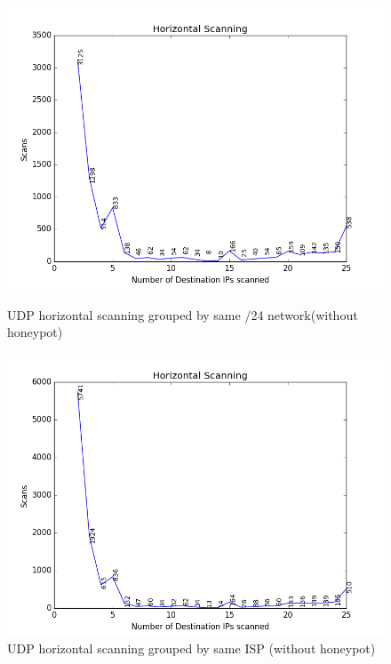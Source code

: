 \begin{figure}
\captionsetup{justification   = raggedright,
              singlelinecheck = false}
\centering
\begin{minipage}{.535\textwidth}
  \centering
  \includegraphics[width=1\linewidth]{images/horizontalscan_udp_classc}
  \caption{UDP horizontal scanning grouped by same /24 network(without honeypot)}
  \label{fig:horizontalscanningudpsameclassc}
\end{minipage}%
\begin{minipage}{.535\textwidth}
  \centering
  \includegraphics[width=1\linewidth]{images/horizontalscan_udp_isp_first}
  \caption{UDP horizontal scanning grouped by same ISP (without honeypot)}
  \label{fig:horizontalscanningudpsameisp}
\end{minipage}
\end{figure}
